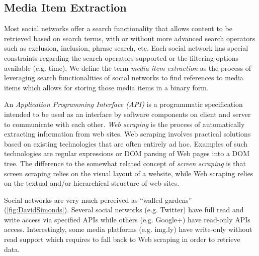 \documentclass{acm_proc_article-sp}
\let\oldemph\emph
\renewcommand{\emph}[1]{\oldemph{\fontsize{9}{9}\selectfont #1}}
\begin{document}
\subsection{Media Item Extraction}
Most social networks offer a search functionality that allows content to be retrieved based on search terms, with or without more advanced 
search operators such as exclusion, inclusion, phrase search, etc. Each social network has special constraints regarding the search operators 
supported or the filtering options available (e.g. time). We define the term \emph{media item extraction} as the process of leveraging 
search functionalities of social networks to find references to media items which allows for storing those media items in a binary form.

An \emph{Application Programming Interface (API)} is a programmatic specification intended to be used as an interface by software components on client and server to communicate with each other. \emph{Web scraping} is the process of automatically extracting information from web sites. Web scraping involves practical solutions based on existing technologies that are often entirely ad hoc. Examples of such technologies are regular expressions or DOM parsing of Web pages into a DOM tree. The difference to the somewhat related concept of \emph{screen scraping} is that screen scraping relies on the visual layout of a website, while Web scraping relies on the textual and/or hierarchical structure of web sites.

Social networks are very much perceived as ``walled gardens'' (\autoref{fig:DavidSimonds}). Several social networks (e.g. Twitter) have full read and write access via specified APIs while others (e.g. Google+) have read-only APIs access. Interestingly, some media platforms (e.g. img.ly) have write-only without read support which requires to fall back to Web scraping in order to retrieve data.
\end{document}
